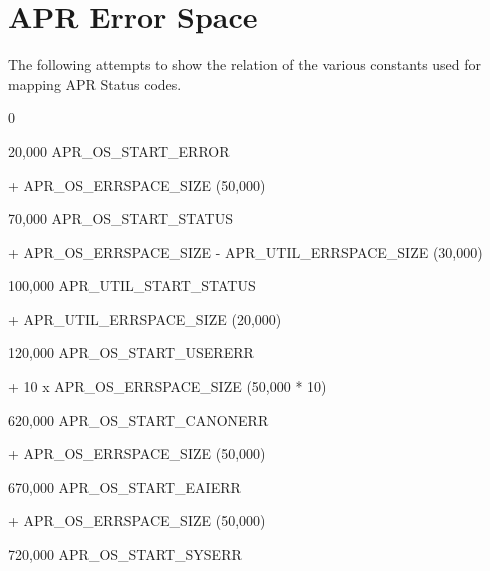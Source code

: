 \hypertarget{group___a_p_r___e_r_r_o_r__map}{\section{A\-P\-R Error Space}
\label{group___a_p_r___e_r_r_o_r__map}
}

\begin{DoxyPre}
The following attempts to show the relation of the various constants
used for mapping APR Status codes.
\begin{DoxyVerb}  0
\end{DoxyVerb}
\end{DoxyPre}



\begin{DoxyPre} 20,000     APR\_OS\_START\_ERROR
\begin{DoxyVerb}   + APR_OS_ERRSPACE_SIZE (50,000)
\end{DoxyVerb}
\end{DoxyPre}



\begin{DoxyPre} 70,000      APR\_OS\_START\_STATUS
\begin{DoxyVerb}   + APR_OS_ERRSPACE_SIZE - APR_UTIL_ERRSPACE_SIZE (30,000)
\end{DoxyVerb}
\end{DoxyPre}



\begin{DoxyPre}100,000      APR\_UTIL\_START\_STATUS
\begin{DoxyVerb}    + APR_UTIL_ERRSPACE_SIZE (20,000)
\end{DoxyVerb}
\end{DoxyPre}



\begin{DoxyPre}120,000      APR\_OS\_START\_USERERR
\begin{DoxyVerb}    + 10 x APR_OS_ERRSPACE_SIZE (50,000 * 10)
\end{DoxyVerb}
\end{DoxyPre}



\begin{DoxyPre}620,000      APR\_OS\_START\_CANONERR
\begin{DoxyVerb}    + APR_OS_ERRSPACE_SIZE (50,000)
\end{DoxyVerb}
\end{DoxyPre}



\begin{DoxyPre}670,000      APR\_OS\_START\_EAIERR
\begin{DoxyVerb}    + APR_OS_ERRSPACE_SIZE (50,000)
\end{DoxyVerb}
\end{DoxyPre}



\begin{DoxyPre}720,000      APR\_OS\_START\_SYSERR\end{DoxyPre}



\begin{DoxyPre}\end{DoxyPre}
 